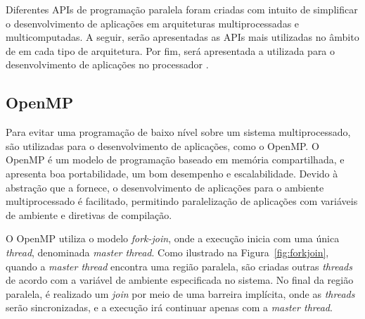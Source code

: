 Diferentes APIs de programação paralela foram criadas com intuito de simplificar
o desenvolvimento de aplicações em arquiteturas multiprocessadas e multicomputadas.
A seguir, serão apresentadas as APIs mais utilizadas no âmbito de \hpc em cada tipo de
arquitetura. Por fim, será apresentada a \api utilizada para o desenvolvimento de aplicações
no processador \mppa.


\subsection{OpenMP}

%


Para evitar uma programação de baixo nível sobre um sistema multiprocessado, são
utilizadas \apis para o desenvolvimento de aplicações, como o OpenMP. O OpenMP
é um modelo de programação baseado em memória compartilhada, e apresenta boa
portabilidade, um bom desempenho e escalabilidade. Devido à abstração que a \api
fornece, o desenvolvimento de aplicações para o ambiente multiprocessado é
facilitado, permitindo paralelização de aplicações com variáveis de ambiente e
diretivas de compilação.

O OpenMP utiliza o modelo \textit{fork-join}, onde a execução inicia com uma
única \textit{thread}, denominada \textit{master thread}. Como ilustrado na
Figura~\ref{fig:forkjoin}, quando a \textit{master thread} encontra
uma região paralela, são criadas outras \textit{threads} de acordo com a variável
de ambiente especificada no sistema. No final da região paralela, é realizado um
\textit{join} por meio de uma barreira implícita, onde as \textit{threads} serão
sincronizadas, e a execução irá continuar apenas com a \textit{master thread}.

